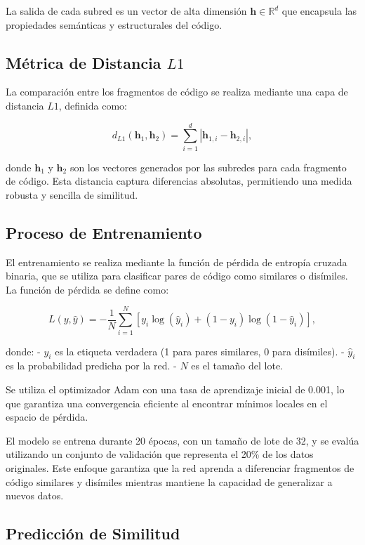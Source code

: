 La salida de cada subred es un vector de alta dimensión \( \mathbf{h} \in \mathbb{R}^d \) que encapsula las propiedades semánticas y estructurales del código.

\subsection{ Métrica de Distancia \( L1 \)}

La comparación entre los fragmentos de código se realiza mediante una capa de distancia \( L1 \), definida como:

\[
d_{L1}(\mathbf{h}_1, \mathbf{h}_2) = \sum_{i=1}^{d} |\mathbf{h}_{1,i} - \mathbf{h}_{2,i}|,
\]

donde \( \mathbf{h}_1 \) y \( \mathbf{h}_2 \) son los vectores generados por las subredes para cada fragmento de código. Esta distancia captura diferencias absolutas, permitiendo una medida robusta y sencilla de similitud.

\subsection{Proceso de Entrenamiento} 

El entrenamiento se realiza mediante la función de pérdida de entropía cruzada binaria, que se utiliza para clasificar pares de código como similares o disímiles. La función de pérdida se define como:

\[
L(y, \hat{y}) = -\frac{1}{N} \sum_{i=1}^{N} \left[ y_i \log(\hat{y}_i) + (1 - y_i) \log(1 - \hat{y}_i) \right],
\]

donde:
- \( y_i \) es la etiqueta verdadera (1 para pares similares, 0 para disímiles).
- \( \hat{y}_i \) es la probabilidad predicha por la red.
- \( N \) es el tamaño del lote.

Se utiliza el optimizador Adam con una tasa de aprendizaje inicial de 0.001, lo que garantiza una convergencia eficiente al encontrar mínimos locales en el espacio de pérdida.

El modelo se entrena durante 20 épocas, con un tamaño de lote de 32, y se evalúa utilizando un conjunto de validación que representa el 20\% de los datos originales. Este enfoque garantiza que la red aprenda a diferenciar fragmentos de código similares y disímiles mientras mantiene la capacidad de generalizar a nuevos datos.

\subsection{Predicción de Similitud} 

